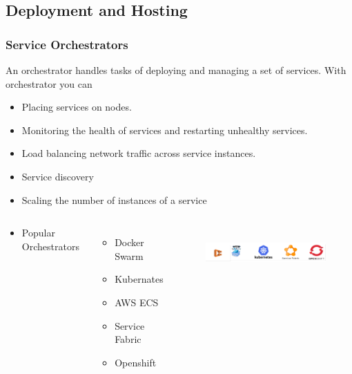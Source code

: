 \documentclass{beamer}
\begin{document}
	\subsection {Deployment and Hosting}
		\begin{frame}
			\frametitle{Service Orchestrators}
				An orchestrator handles tasks of deploying and managing a set of services. With orchestrator you can 
				\scriptsize
				\begin{itemize}
					\item<1-> Placing services on nodes. 
					\item<2-> Monitoring the health of services and restarting unhealthy services.
					\item<3-> Load balancing network traffic across service instances. 
					\item<4-> Service discovery
					\item<5-> Scaling the number of instances of a service
					\item<6->[]
						\vspace{5mm}
						\begin{columns}[c]
							Popular Orchestrators
							\begin{itemize}
								\item Docker Swarm
								\item Kubernates
								\item AWS ECS
								\item Service Fabric
								\item Openshift
							\end{itemize}
							
							\begin{figure}[h]
								\includegraphics[width=70mm, height=20mm, scale=1]{img/service-orch.png}
							\end{figure}\vspace{1mm}
						\end{columns}
				\end{itemize}
			\vspace{100mm}
		\end{frame}
	
\end{document}
